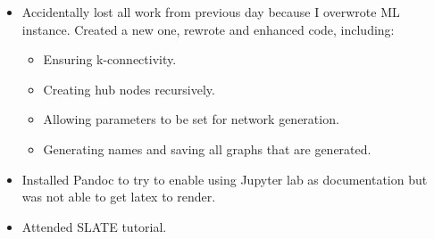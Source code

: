 \documentclass{weeklyreport}
\begin{document}
\begin{itemize}
    \item Accidentally lost all work from previous day because I overwrote ML instance. Created a new one, rewrote and enhanced code, including:
    \begin{itemize}
    	\item Ensuring k-connectivity.
    	\item Creating hub nodes recursively.
    	\item Allowing parameters to be set for network generation.
    	\item Generating names and saving all graphs that are generated.
    \end{itemize}
    \item Installed Pandoc to try to enable using Jupyter lab as documentation but was not able to get latex to render.
    \item Attended SLATE tutorial.

\end{itemize}
\end{document}
